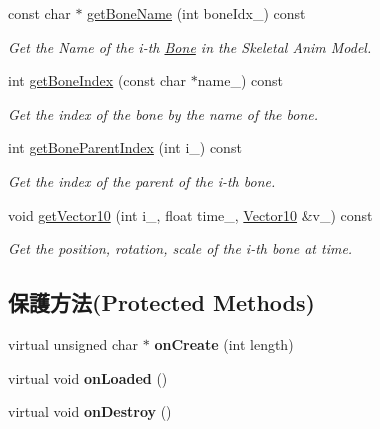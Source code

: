 \begin{DoxyCompactItemize}
\item 
const char $\ast$ \hyperlink{class_magnum_1_1_skeletal_anim_model_1_1_resource_a23486b38149a4e3d46b9929adf2637fc}{get\+Bone\+Name} (int bone\+Idx\+\_\+) const 
\begin{DoxyCompactList}\small\item\em Get the Name of the i-\/th \hyperlink{class_magnum_1_1_skeletal_anim_model_1_1_bone}{Bone} in the Skeletal Anim Model. \end{DoxyCompactList}\item 
int \hyperlink{class_magnum_1_1_skeletal_anim_model_1_1_resource_ae93a5931b0c202f290bc752fcdcb7e2a}{get\+Bone\+Index} (const char $\ast$name\+\_\+) const 
\begin{DoxyCompactList}\small\item\em Get the index of the bone by the name of the bone. \end{DoxyCompactList}\item 
int \hyperlink{class_magnum_1_1_skeletal_anim_model_1_1_resource_a9626914b5f7ed374cfe31af9c1dd81cf}{get\+Bone\+Parent\+Index} (int i\+\_\+) const 
\begin{DoxyCompactList}\small\item\em Get the index of the parent of the i-\/th bone. \end{DoxyCompactList}\item 
void \hyperlink{class_magnum_1_1_skeletal_anim_model_1_1_resource_a19030df08b1b4e27e738f43c44eb11c5}{get\+Vector10} (int i\+\_\+, float time\+\_\+, \hyperlink{class_magnum_1_1_vector10}{Vector10} \&v\+\_\+) const 
\begin{DoxyCompactList}\small\item\em Get the position, rotation, scale of the i-\/th bone at time. \end{DoxyCompactList}\end{DoxyCompactItemize}
\subsection*{保護方法(Protected Methods)}
\begin{DoxyCompactItemize}
\item 
virtual unsigned char $\ast$ {\bfseries on\+Create} (int length)\hypertarget{class_magnum_1_1_skeletal_anim_model_1_1_resource_a4c951f7181fccfc64a2f490e03481c83}{}\label{class_magnum_1_1_skeletal_anim_model_1_1_resource_a4c951f7181fccfc64a2f490e03481c83}

\item 
virtual void {\bfseries on\+Loaded} ()\hypertarget{class_magnum_1_1_skeletal_anim_model_1_1_resource_aeb5b7371d53cc0b8b6552dc62a72698a}{}\label{class_magnum_1_1_skeletal_anim_model_1_1_resource_aeb5b7371d53cc0b8b6552dc62a72698a}

\item 
virtual void {\bfseries on\+Destroy} ()\hypertarget{class_magnum_1_1_skeletal_anim_model_1_1_resource_aafe6cd940dd35eaf4e65f6c98accd3d4}{}\label{class_magnum_1_1_skeletal_anim_model_1_1_resource_aafe6cd940dd35eaf4e65f6c98accd3d4}

\end{DoxyCompactItemize}
